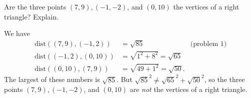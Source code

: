 \documentclass[12pt,fleqn,answers]{exam}
\newcommand{\dist}{\, \mathrm{dist}}
\begin{document}
\begin{questions}
\begin{solution}[2.0in]
\end{solution}


\question[5] Are the three points  $(7,9), (-1,-2)$, and  $(0,10)$ the vertices of
a right triangle? Explain.

\begin{solution}
We have
\begin{align*}
    \dist((7,9), (-1,2)) &= \sqrt{85} &\mbox{(problem 1)}\\
    \dist((-1,2), (0,10)) &= \sqrt{1^2 + 8^2} = \sqrt{65} \\
    \dist((0,10),(7,9)) &= \sqrt{49 + 1^2} = \sqrt{50} .
\end{align*}
The largest of these numbers is $\sqrt{85}$. But $\sqrt{85}^2 \neq \sqrt{65}^2 + \sqrt{50}^2$,
so the three points $(7,9), (-1,-2)$, and  $(0,10)$ are \emph{not} the vertices of a
right triangle.

\end{solution}

\end{questions}
\end{document}
